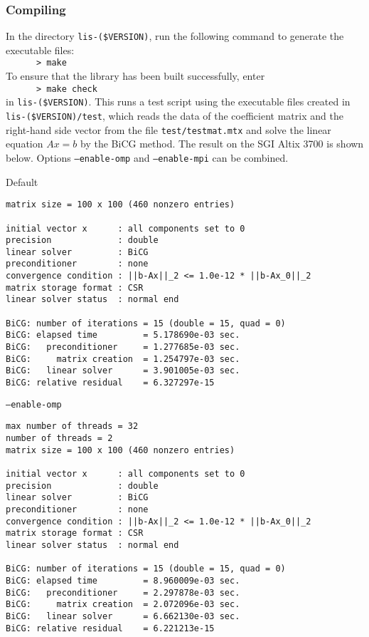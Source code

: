 \documentclass[a4paper]{article}
\begin{document}
\subsubsection{Compiling}
In the directory {\tt lis-(\$VERSION)}, run the following command to generate
the executable files: \\
 \verb+      > make +\\
To ensure that the library has been built successfully, enter 
\\
 \verb+      > make check+\\
in {\tt lis-(\$VERSION)}. 
This runs a test script using the executable files created 
in {\tt lis-(\$VERSION)/test}, which reads 
the data of the coefficient matrix and the right-hand side vector 
from the file 
{\tt test/testmat.mtx} and solve the linear equation $Ax = b$ 
by the BiCG method. The result on the SGI Altix 3700 is
 shown below. Options {\tt --enable-omp} and {\tt --enable-mpi} can be combined.
\begin{itemsquarebox}[l]{Default}
 \begin{minipage}{10cm}
 \begin{verbatim}
matrix size = 100 x 100 (460 nonzero entries)

initial vector x      : all components set to 0
precision             : double
linear solver         : BiCG
preconditioner        : none
convergence condition : ||b-Ax||_2 <= 1.0e-12 * ||b-Ax_0||_2
matrix storage format : CSR
linear solver status  : normal end

BiCG: number of iterations = 15 (double = 15, quad = 0)
BiCG: elapsed time         = 5.178690e-03 sec.
BiCG:   preconditioner     = 1.277685e-03 sec. 
BiCG:     matrix creation  = 1.254797e-03 sec.
BiCG:   linear solver      = 3.901005e-03 sec.
BiCG: relative residual    = 6.327297e-15
 \end{verbatim}
 \end{minipage}
\end{itemsquarebox}
\begin{itemsquarebox}[l]{{\tt --enable-omp}}
 \begin{minipage}{10cm}
 \begin{verbatim}
max number of threads = 32
number of threads = 2
matrix size = 100 x 100 (460 nonzero entries)

initial vector x      : all components set to 0
precision             : double
linear solver         : BiCG
preconditioner        : none
convergence condition : ||b-Ax||_2 <= 1.0e-12 * ||b-Ax_0||_2
matrix storage format : CSR
linear solver status  : normal end

BiCG: number of iterations = 15 (double = 15, quad = 0)
BiCG: elapsed time         = 8.960009e-03 sec.
BiCG:   preconditioner     = 2.297878e-03 sec. 
BiCG:     matrix creation  = 2.072096e-03 sec.
BiCG:   linear solver      = 6.662130e-03 sec.
BiCG: relative residual    = 6.221213e-15
 \end{verbatim}
 \end{minipage}
\end{itemsquarebox}
\end{document}
